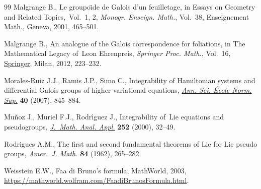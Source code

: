 \documentclass[pdftex]{sigma}
\numberwithin{equation}{section}
\theoremstyle{definition}
\begin{document}
\begin{thebibliography}{99}
Malgrange B., Le groupo\"{\i}de de {G}alois d'un feuilletage, in Essays on
 {G}eometry and {R}elated {T}opics,~{V}ol.~1, 2, \textit{Monogr. Enseign.
 Math.}, Vol.~38, Enseignement Math., Geneva, 2001, 465--501.

Malgrange B., An analogue of the {G}alois correspondence for foliations, in The
 {M}athematical {L}egacy of~{L}eon {E}hrenpreis, \textit{Springer Proc.
 Math.}, Vol.~16,
 \href{https://doi.org/10.1007/978-88-470-1947-8_14}{Springer}, Milan, 2012,
 223--232.

Morales-Ruiz J.J., Ramis J.P., Simo C., Integrability of {H}amiltonian systems
 and differential {G}alois groups of higher variational equations,
 \href{https://doi.org/10.1016/j.ansens.2007.09.002}{\textit{Ann. Sci.
 \'{E}cole Norm. Sup.}} \textbf{40} (2007), 845--884.

Mu\~noz J., Muriel F.J., Rodr\'{\i}guez J., Integrability of~{L}ie equations
 and pseudogroups,
 \href{https://doi.org/10.1006/jmaa.2000.6805}{\textit{J.~Math. Anal. Appl.}}
 \textbf{252} (2000), 32--49.

Rodrigues A.M., The first and second fundamental theorems of {L}ie for {L}ie
 pseudo groups, \href{https://doi.org/10.2307/2372762}{\textit{Amer.~J.
 Math.}} \textbf{84} (1962), 265--282.

Weisstein E.W., Faa di {B}runo's formula, {M}athWorld, 2003,
 \url{https://mathworld.wolfram.com/FaadiBrunosFormula.html}.

\end{thebibliography}\LastPageEnding
\end{document}
